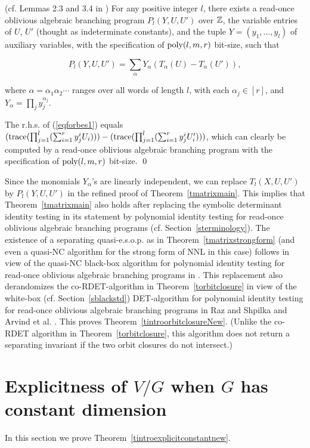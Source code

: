 \documentclass[11pt]{article}
\begin{document}
\begin{lemma} (cf. Lemmas 2.3 and 3.4 in \cite{fs3}) \label{lforbes}
For any positive integer $l$, there exists a  read-once oblivious algebraic branching program
$P_l(Y,U,U')$
over $\mathbb{Z}$,  the variable entries of $U$, $U'$ (thought as indeterminate constants), and the tuple  $Y=(y_1,\ldots,y_l)$ of 
auxiliary variables,  with the 
specification of ${\mbox {poly}}(l,m,r)$ bit-size, such that 

\begin{equation} \label{eqforbes1}
P_l(Y,U,U')= \sum_\alpha Y_\alpha (T_\alpha(U)-T_\alpha(U')),
\end{equation}

where $\alpha=\alpha_1 \alpha_2 \cdots$ ranges over  all words of length $l$, with each $\alpha_j \in [r]$, and $Y_\alpha=\prod_j y_j^{\alpha_j}$.
\end{lemma}
\proof The r.h.s. of (\ref{eqforbes1}) equals $({\mbox {trace}}(\prod_{j=1}^l (\sum_{i=1}^r y_j^i U_i)))-({\mbox {trace}}(\prod_{j=1}^l (\sum_{i=1}^r y_j^i U'_i)))$, which 
can clearly be computed by a read-once oblivious algebraic 
branching program with the specification of   ${\mbox {poly}}(l,m,r)$ bit-size. \qed

Since the monomials $Y_\alpha$'s are linearly independent, we can replace $T_l(X,U,U')$ by $P_l(Y,U,U')$ in the refined proof of
 Theorem~\ref{tmatrixmain}.
This implies  that Theorem~\ref{tmatrixmain} also holds after replacing
the symbolic determinant identity testing in its statement
by polynomial identity testing  for read-once oblivious algebraic branching programs
(cf.  Section~\ref{sterminology}).
The existence of a separating quasi-e.s.o.p. as in Theorem~\ref{tmatrixstrongform}
(and even a quasi-NC algorithm for the strong form of NNL in this case)
follows in view of the  quasi-NC black-box algorithm for polynomial identity testing 
for read-once oblivious algebraic branching programs  in \cite{fs2}.
This replacement also derandomizes 
the co-RDET-algorithm in  Theorem~\ref{torbitclosure} in view of 
the  white-box (cf. Section~\ref{sblackstd}) 
 DET-algorithm  for polynomial identity testing  for read-once oblivious
algebraic branching programs  in Raz and Shpilka and Arvind et al. \cite{raz,arvind}. 
This proves Theorem~\ref{tintroorbitclosureNew}.
(Unlike the co-RDET algorithm in Theorem~\ref{torbitclosure},
this algorithm does not return a separating invariant if 
the two orbit closures do not intersect.)  



%
\section{Explicitness of $V/G$ when $G$ has constant dimension}\label{sexpconstant}
In this section we prove Theorem~\ref{tintroexplicitconstantnew}.
\end{document}
